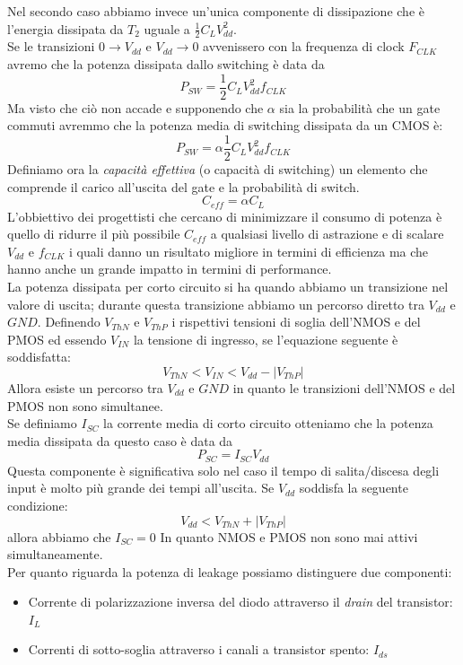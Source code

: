 Nel secondo caso abbiamo invece un'unica componente di dissipazione che è l'energia dissipata da $T_2$ uguale a $\frac{1}{2}C_LV_{dd}^2$.\\
Se le transizioni $0 \rightarrow V_{dd}$ e $V_{dd} \rightarrow 0$ avvenissero con la frequenza di clock $F_{CLK}$ avremo che la potenza dissipata dallo switching è data da 
$$P_{SW} = \frac{1}{2}C_LV_{dd}^2 f_{CLK}$$
Ma visto che ciò non accade e supponendo che $\alpha$ sia la probabilità che un gate commuti avremmo che la potenza media di switching dissipata da un CMOS è:
$$P_{SW} = \alpha \frac{1}{2}C_LV_{dd}^2 f_{CLK}$$
Definiamo ora la \emph{capacità effettiva} (o capacità di switching) un elemento che comprende il carico all'uscita del gate e la probabilità di switch.
$$C_{eff} = \alpha C_L$$
L'obbiettivo dei progettisti che cercano di minimizzare il consumo di potenza è quello di ridurre il più possibile $C_{eff}$ a qualsiasi livello di astrazione  e di scalare  $V_{dd}$ e $f_{CLK}$ i quali danno un risultato migliore in termini di efficienza ma che hanno anche un grande impatto in termini di performance.\\
La potenza dissipata per corto circuito si ha quando abbiamo un transizione nel valore di uscita; durante questa transizione abbiamo un percorso diretto tra $V_{dd}$ e $GND$.
Definendo $V_{ThN}$ e $V_{ThP}$ i rispettivi tensioni di soglia dell'NMOS e del PMOS ed essendo $V_{IN}$ la tensione di ingresso, se l'equazione seguente è soddisfatta:
$$V_{ThN} < V_{IN} < V_{dd} - |V_{ThP}| $$
Allora esiste un percorso tra $V_{dd}$ e $GND$ in quanto le transizioni dell'NMOS e del PMOS non sono simultanee.\\
Se definiamo $I_{SC}$ la corrente media di corto circuito otteniamo che la potenza media dissipata da questo caso è data da 
$$P_{SC} = I_{SC} V_{dd}$$
Questa componente è significativa solo nel caso il tempo di salita/discesa degli input è molto più grande dei tempi all'uscita. Se $V_{dd}$ soddisfa la seguente condizione:
$$V_{dd} < V_{ThN} + |V_{ThP}|$$
allora abbiamo che $I_{SC} = 0$ In quanto NMOS e PMOS non sono mai attivi simultaneamente.\\
Per quanto riguarda la potenza di leakage possiamo distinguere due componenti:
\begin{itemize}
\item Corrente di polarizzazione inversa del diodo attraverso il \emph{drain} del transistor: $I_L$
\item Correnti di sotto-soglia attraverso i canali a transistor spento: $I_{ds}$
\end{itemize}
